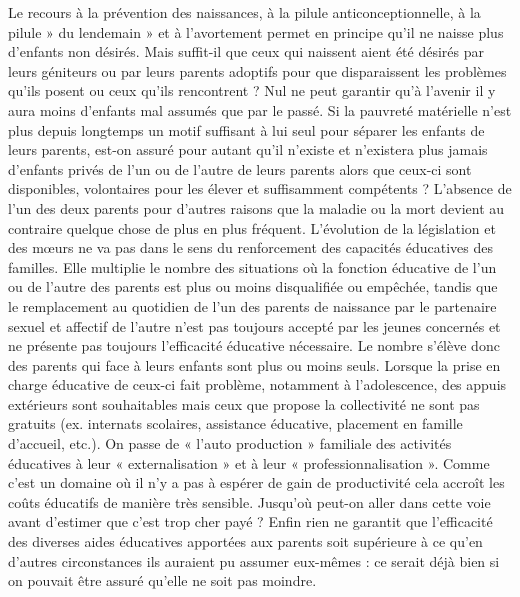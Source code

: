  Le recours à la prévention des naissances, à la pilule anticonceptionnelle, à la pilule » du lendemain » et à l'avortement permet en principe qu'il ne naisse plus d'enfants non désirés. Mais suffit-il que ceux qui naissent aient été désirés par leurs géniteurs ou par leurs parents adoptifs pour que disparaissent les problèmes qu'ils posent ou ceux qu'ils rencontrent ? Nul ne peut garantir qu'à l'avenir il y aura moins d'enfants mal assumés que par le passé. 
 Si la pauvreté matérielle n'est plus depuis longtemps un motif suffisant à lui seul pour séparer les enfants de leurs parents, est-on assuré pour autant qu'il n'existe et n'existera plus jamais d'enfants privés de l'un ou de l'autre de leurs parents alors que ceux-ci sont disponibles, volontaires pour les élever et suffisamment compétents ? L'absence de l'un des deux parents pour d'autres raisons que la maladie ou la mort devient au contraire quelque chose de plus en plus fréquent. 
 L'évolution de la législation et des mœurs ne va pas dans le sens du renforcement des capacités éducatives des familles. Elle multiplie le nombre des situations où la fonction éducative de l'un ou de l'autre des parents est plus ou moins disqualifiée ou empêchée, tandis que le remplacement au quotidien de l'un des parents de naissance par le partenaire sexuel et affectif de l'autre n'est pas toujours accepté par les jeunes concernés et ne présente pas toujours l'efficacité éducative nécessaire. 
 Le nombre s'élève donc des parents qui face à leurs enfants sont plus ou moins seuls. Lorsque la prise en charge éducative de ceux-ci fait problème, notamment à l'adolescence, des appuis extérieurs sont souhaitables mais ceux que propose la collectivité ne sont pas gratuits (ex. internats scolaires, assistance éducative, placement en famille d'accueil, etc.). On passe de « l'auto production » familiale des activités éducatives à leur « externalisation » et à leur « professionnalisation ». Comme c'est un domaine où il n'y a pas à espérer de gain de productivité cela accroît les coûts éducatifs de manière très sensible. Jusqu'où peut-on aller dans cette voie avant d'estimer que c'est trop cher payé ? Enfin rien ne garantit que l'efficacité des diverses aides éducatives apportées aux parents soit supérieure à ce qu'en d'autres circonstances ils auraient pu assumer eux-mêmes : ce serait déjà bien si on pouvait être assuré qu'elle ne soit pas moindre. 
 

